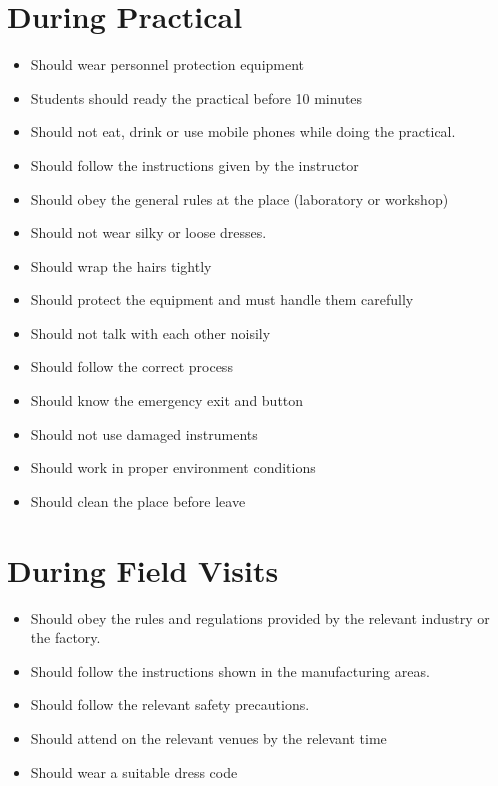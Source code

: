 \documentclass[12pt,a4paper]{article}
\begin{document}
\newpage
\section{During Practical}
\begin{itemize}
\item Should wear personnel protection equipment
\item Students should ready the practical before 10 minutes
\item Should not eat, drink or use mobile phones while doing the practical.
\item Should follow the instructions given by the instructor
\item Should obey the general rules at the place (laboratory or workshop)
\item Should not wear silky or loose dresses.
\item Should wrap the hairs tightly
\item Should protect the equipment and must handle them carefully
\item Should not talk with each other noisily
\item Should follow the correct process
\item Should know the emergency exit and button
\item Should not use damaged instruments
\item Should work in proper environment conditions
\item Should clean the place before leave
\end{itemize}

\newpage
\section{During Field Visits}
\begin{itemize}
\item Should obey the rules and regulations provided by the relevant industry or the factory.
\item Should follow the instructions shown in the manufacturing areas.
\item Should follow the relevant safety precautions.
\item Should attend on the relevant venues by the relevant time
\item Should wear a suitable dress code
\end{itemize}

\newpage
\end{document}
